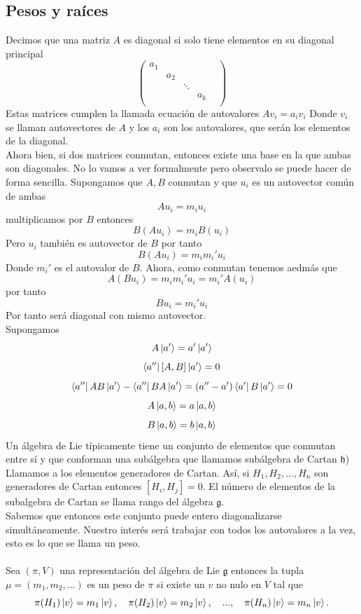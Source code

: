 \documentclass[12pt]{article}
\begin{document}
\subsection*{Pesos y raíces}
Decimos que una matriz $A$ es diagonal si solo tiene elementos en su diagonal principal 
$$\begin{pmatrix}
    a_1 &  &  & &  \\ 
     &a_2 & & & \\
     &  & \ddots& \\ 
    &  &    &a_k \\
\end{pmatrix}$$
Estas matrices cumplen la llamada ecuación de autovalores 
$A v_i = a_i v_i$ 
Donde $v_i$ se llaman autovectores de $A$ y los $a_i$ son los autovalores, que serán los elementos de la diagonal. \\
Ahora bien, si dos matrices conmutan, entonces existe una base en la que ambas son diagonales. No lo vamos a ver formalmente pero observalo se puede hacer de forma sencilla. Supongamos que $A, B$ conmutan y que $u_i$ es un autovector común de ambas
$$A u_i = m_i u_i$$
multiplicamos por $B$ entonces
$$B (A u_i) = m_i B(u_i)$$
Pero $u_i$ también es autovector de $B$ por tanto
$$B (A u_i)= m_i m_i' u_i$$
Donde $m_i'$ es el autovalor de $B$.
Ahora, como conmutan tenemos aedmás que
$$A (B u_i) =m_i m_i' u_i= m_i'A(u_i)$$ 
por tanto 
$$B u_i = m_i' u_i$$
Por tanto será diagonal con mismo autovector. 
\\
Supongamos 
$$A\ket{a'}=a'\ket{a'}$$
$$\bra{a''}[A,B]\ket{a'}= 0$$
$$\bra{a''}AB\ket{a'}-\bra{a''}BA\ket{a'}=(a''-a')\bra{a'}B\ket{a'}=0$$
$$A\ket{a,b}=a\ket{a,b}$$
$$B\ket{a,b}=b\ket{a,b}$$
Un álgebra de Lie típicamente tiene un conjunto de elementos que conmutan entre sí y que conforman una subálgebra que llamamos subálgebra de Cartan $\mathfrak{h}$) Llamamos a los elementos generadores de Cartan. Así,  si $H_1, H_2, \dots, H_n$ son generadores de Cartan entonces $[H_i, H_j]=0$. 
El número de elementos de la subalgebra de Cartan se llama rango del álgebra $\mathfrak{g}$. \\ 
Sabemos que entonces este conjunto puede entero diagonalizarse simultáneamente. Nuestro interés será trabajar con todos los autovalores a la vez, esto es lo que se llama un peso. \\\\
Sea $(\pi, V)$ una representación del álgebra de Lie $\mathfrak{g}$ entonces la tupla $\mu=(m_1, m_2, \dots)$ es un peso de $\pi$ si existe un $v$ no nulo en $V$ tal que
$$\pi(H_1)\ket{v}=m_1\ket{v}, \ \ \  \pi(H_2)\ket{v}=m_2\ket{v}, \ \ \  ..., \ \ \  \pi(H_n)\ket{v}=m_n\ket{v}.$$
\end{document}
